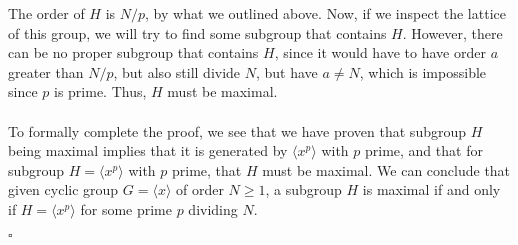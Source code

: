 \documentclass[letterpaper]{article}
\newcommand*{\QED}{\hfill\ensuremath{\square}}%
\begin{document}
The order of $ H $ is $ N / p $, by what we outlined above.
Now, if we inspect the lattice of this group, we will try to find some subgroup that contains $ H $.
However, there can be no proper subgroup that contains $ H $, since it would have to have order $ a $ greater than $ N / p $, but also still divide $ N $, but have $ a \neq N $, which is impossible since $ p $ is prime.
Thus, $ H $ must be maximal.
\\ \\
To formally complete the proof, we see that we have proven that subgroup $ H $ being maximal implies that it is generated by $ \langle x^p \rangle $ with $ p $ prime, and that for subgroup $ H = \langle x^p \rangle $ with $ p $ prime, that $ H $ must be maximal.
We can conclude that given cyclic group $ G = \langle x \rangle $ of order $ N \geq 1 $, a subgroup $ H $ is maximal if and only if $ H = \langle x^p \rangle $ for some prime $ p $ dividing $ N $.

\QED{}
\end{document}
